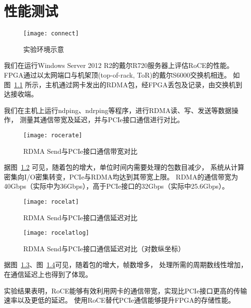 \chapter{性能测试}
\begin{figure}[htbp]
\centering
\texttt{[image: connect]}
\caption{实验环境示意} \label{fig:connect}
\end{figure}
我们在运行Windows Server 2012 R2的戴尔R720服务器上评估RoCE的性能。
FPGA通过以太网端口与机架顶(top-of-rack, ToR)的戴尔S6000交换机\cite{s6000}相连。
如图~\ref{fig:connect} 所示，主机通过网卡发出的RDMA包，经FPGA丢包及记录，由交换机到达接收端。

我们在主机上运行ndping、ndrping等程序，进行RDMA读、写、发送等数据操作，
测量其通信带宽及延迟，并与PCIe接口通信进行对比。

\begin{figure}[htbp]
\centering
\texttt{[image: rocerate]}
\caption{RDMA Send与PCIe接口通信带宽对比} \label{fig:rocerate}
\end{figure}

据图~\ref{fig:rocerate} 可见，随着包的增大，单位时间内需要处理的包数目减少，
系统从计算密集向I/O密集转变，PCIe与RDMA均达到其带宽上限。
RDMA的通信带宽为40Gbps（实际中为36Gbps），高于PCIe接口的32Gbps（实际中25.6Gbps）。

\begin{figure}[htbp]
\centering
\texttt{[image: rocelat]}
\caption{RDMA Send与PCIe接口通信延迟对比} \label{fig:rocelat}
\end{figure}

\begin{figure}[htbp]
\centering
\texttt{[image: rocelatlog]}
\caption{RDMA Send与PCIe接口通信延迟对比（对数纵坐标）} \label{fig:rocelatlog}
\end{figure}

据图~\ref{fig:rocelat}、图~\ref{fig:rocelatlog}可见，随着包的增大，帧数增多，
处理所需的周期数线性增加，在通信延迟上也得到了体现。

实验结果表明，RoCE能够有效利用网卡的通信带宽，实现比PCIe接口更高的传输速率以及更低的延迟。
使用RoCE替代PCIe通信能够提升FPGA的存储性能。
